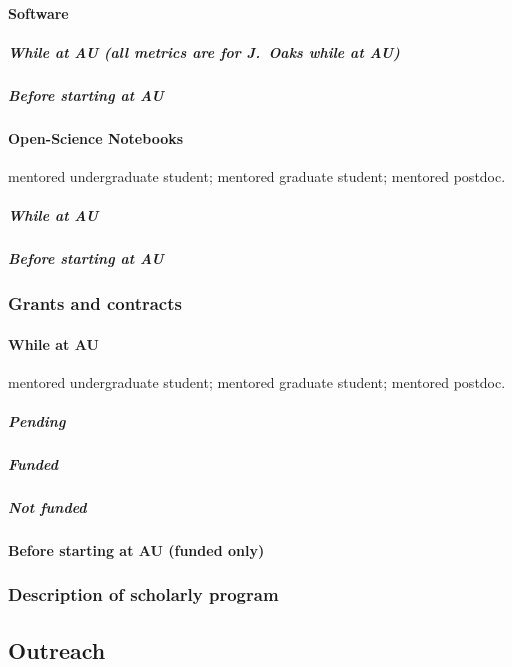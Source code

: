 \paragraph{Software}
\subparagraph*{While at AU (all metrics are for J.\ Oaks while at AU)}


\subparagraph*{Before starting at AU}


\paragraph{Open-Science Notebooks}
\ugsymbol{}mentored undergraduate student;
\phdsymbol{}mentored graduate student;
\postdocsymbol{}mentored postdoc.
\subparagraph{While at AU}
\nocite{*}
\printbibliography[filter=openscinotebooks, check=afteraustart, heading=none]

\subparagraph{Before starting at AU}
\nocite{*}
\printbibliography[filter=openscinotebooks, check=beforeaustart, heading=none]

\subsubsection{Grants and contracts}

\paragraph{While at AU}
\ugsymbol{}mentored undergraduate student;
\phdsymbol{}mentored graduate student;
\postdocsymbol{}mentored postdoc.

\subparagraph*{Pending}


\subparagraph*{Funded}


\subparagraph{Not funded}


\paragraph{Before starting at AU (funded only)}


\subsubsection{Description of scholarly program}


\subsection{Outreach}

